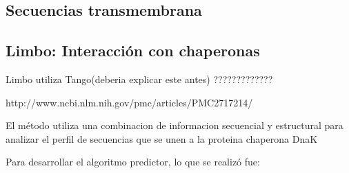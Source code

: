   
  
  
  
\subsection{Secuencias transmembrana}
\cite{sonnhammer1998hidden}
\cite{krogh2001predicting}





\subsection{Limbo: Interacción con chaperonas}

Limbo utiliza Tango(deberia explicar este antes) ?????????????

http://www.ncbi.nlm.nih.gov/pmc/articles/PMC2717214/



El método utiliza una combinacion de informacion secuencial y estructural para analizar el perfil de secuencias que se unen a la proteina chaperona DnaK

Para desarrollar el algoritmo predictor, lo que se realizó fue:

